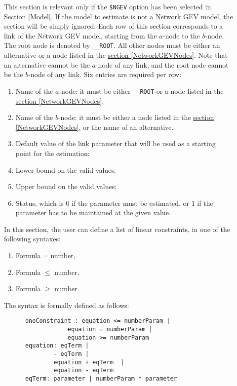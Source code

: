 \documentclass[12pt]{memoir}
\begin{document}
\begin{description}
   \item[] This section is relevant only if the
      \verb+$NGEV+ option has been selected in \hyperlink{Model}{Section
      [Model]}. If the model to estimate is not a Network GEV model, the section
      will be simply ignored.  Each row of this section corresponds to a link of the
      Network GEV model, starting from the $a$-node to the $b$-node.
       The root node is denoted by \verb+__ROOT+.
       All other nodes must be either an alternative or a node listed in
       the \hyperlink{NetworkGEVNodes}{section [NetworkGEVNodes]}.
       Note that an alternative cannot be the $a$-node of any link,
       and the root node cannot be the $b$-node of any link.
       Six entries are required per row: 
      \begin{enumerate}
         \item Name of the $a$-node: it must be either \verb+__ROOT+ or  a node listed in
            the \hyperlink{NetworkGEVNodes}{section [NetworkGEVNodes]}.  
         \item Name of the $b$-node: it must be either a node listed in
             the \hyperlink{NetworkGEVNodes}{section [NetworkGEVNodes]}, or the name of an
            alternative.  
         \item Default value of the link parameter that will be used as a starting point for the estimation;
         \item Lower bound on the valid values.
         \item Upper bound on the valid values;
         \item Status, which is 0 if the parameter must be estimated, or 1 if the parameter has to be maintained at the given value. 
      \end{enumerate}


   \item[]
      In this section, the user can define a list of linear constraints, in one of the following syntaxes:
      \begin{enumerate}
         \item Formula = number,
         \item Formula $\leq$ number,
         \item Formula $\geq$ number.
      \end{enumerate}
      
      The syntax is formally defined as follows:
{\footnotesize
      \begin{verbatim}
      oneConstraint : equation <= numberParam | 
                  equation = numberParam | 
                  equation >= numberParam  
      equation: eqTerm |  
              - eqTerm | 
              equation + eqTerm  | 
              equation - eqTerm 
      eqTerm: parameter | numberParam * parameter 
      \end{verbatim}
}
      

\end{description}
\end{document}

